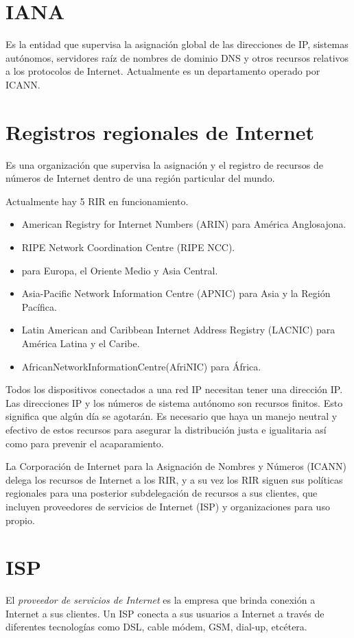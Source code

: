 \documentclass[a4paper,12pt]{article}
\begin{document}
\section{IANA}
Es la entidad que supervisa la asignación global de las direcciones de IP, sistemas autónomos, servidores raíz de nombres de dominio DNS y otros recursos relativos a los protocolos de Internet. Actualmente es un departamento operado por ICANN.

\section{Registros regionales de Internet}
Es una organización que supervisa la asignación y el registro de recursos de números de Internet dentro de una región particular del mundo.

Actualmente hay 5 RIR en funcionamiento.
\begin{itemize}
\item American Registry for Internet Numbers (ARIN) para América Anglosajona.
\item RIPE Network Coordination Centre (RIPE NCC).
\item para Europa, el Oriente Medio y Asia Central.
\item Asia-Pacific Network Information Centre (APNIC) para Asia y la Región Pacífica.
\item Latin American and Caribbean Internet Address Registry (LACNIC) para América Latina y el Caribe.
\item AfricanNetworkInformationCentre(AfriNIC) para África.
\end{itemize}

Todos los dispositivos conectados a una red IP necesitan tener una dirección IP. Las direcciones IP y los números de sistema autónomo son recursos finitos. Esto significa que algún día se agotarán. Es necesario que haya un manejo neutral y efectivo de estos recursos para asegurar la distribución justa e igualitaria así como para prevenir el acaparamiento.

La Corporación de Internet para la Asignación de Nombres y Números (ICANN) delega los recursos de Internet a los RIR, y a su vez los RIR siguen sus políticas regionales para una posterior subdelegación de recursos a sus clientes, que incluyen proveedores de servicios de Internet (ISP) y organizaciones para uso propio.
\section{ISP}
El \textit{proveedor de servicios de Internet} es la empresa que brinda conexión a Internet a sus clientes. Un ISP conecta a sus usuarios a Internet a través de diferentes tecnologías como DSL, cable módem, GSM, dial-up, etcétera.
\end{document}
